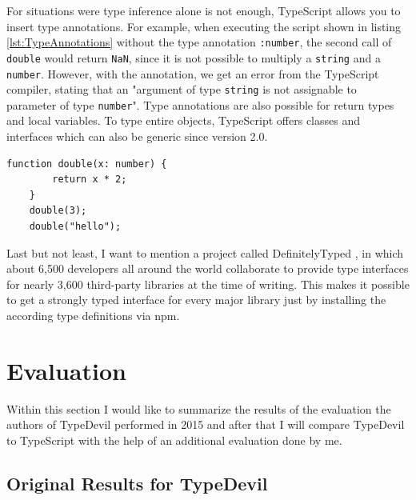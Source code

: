 \documentclass[runningheads,a4paper]{llncs}
\begin{document}
For situations were type inference alone is not enough, TypeScript allows you to insert type annotations.
For example, when executing the script shown in listing \ref{lst:TypeAnnotations} without the type annotation \lstinline[columns=fixed]{:number}, the second call of \lstinline[columns=fixed]{double} would return \lstinline[columns=fixed]{NaN}, since it is not possible to multiply a \lstinline[columns=fixed]{string} and a \lstinline[columns=fixed]{number}.
However, with the annotation, we get an error from the TypeScript compiler, stating that an "argument of type \lstinline[columns=fixed]{string} is not assignable to parameter of type \lstinline[columns=fixed]{number}".
Type annotations are also possible for return types and local variables.
To type entire objects, TypeScript offers classes and interfaces which can also be generic since version 2.0.

\medskip\medskip
\lstset{language=javascript}
\begin{minipage}{\linewidth}
\begin{lstlisting}[frame=single, caption=Type Annotations, label={lst:TypeAnnotations}]
    function double(x: number) {
        return x * 2;
    }
    double(3);
    double("hello");
\end{lstlisting}
\end{minipage}

Last but not least, I want to mention a project called DefinitelyTyped \cite{DefinitelyTyped}, in which about 6,500 developers all around the world collaborate to provide type interfaces for nearly 3,600 third-party libraries at the time of writing.
This makes it possible to get a strongly typed interface for every major library just by installing the according type definitions via npm.

\section{Evaluation}

Within this section I would like to summarize the results of the evaluation the authors of TypeDevil performed in 2015 and after that I will compare TypeDevil to TypeScript with the help of an additional evaluation done by me.

\subsection{Original Results for TypeDevil}
\end{document}
